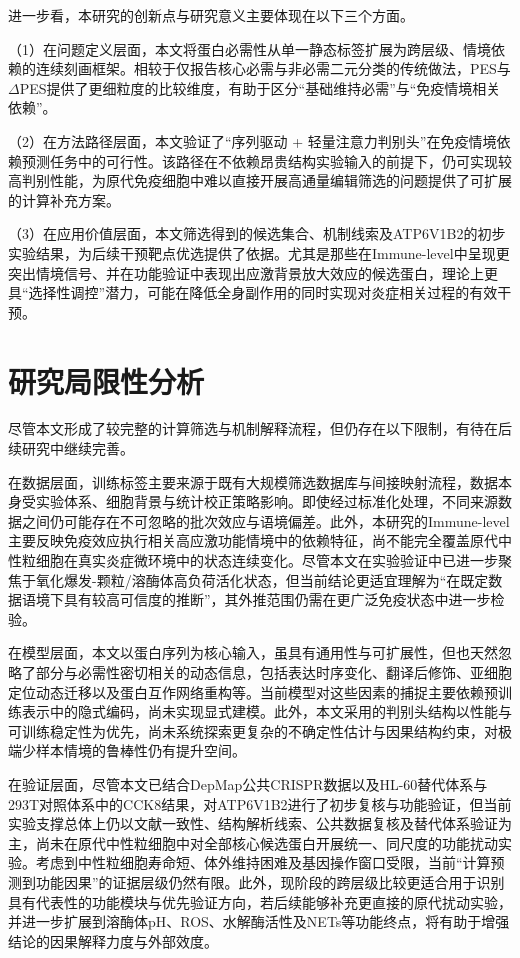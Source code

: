 进一步看，本研究的创新点与研究意义主要体现在以下三个方面。

（1）在问题定义层面，本文将蛋白必需性从单一静态标签扩展为跨层级、情境依赖的连续刻画框架。相较于仅报告核心必需与非必需二元分类的传统做法，PES与 $\Delta$PES提供了更细粒度的比较维度，有助于区分“基础维持必需”与“免疫情境相关依赖”。

（2）在方法路径层面，本文验证了“序列驱动 + 轻量注意力判别头”在免疫情境依赖预测任务中的可行性。该路径在不依赖昂贵结构实验输入的前提下，仍可实现较高判别性能，为原代免疫细胞中难以直接开展高通量编辑筛选的问题提供了可扩展的计算补充方案。

（3）在应用价值层面，本文筛选得到的候选集合、机制线索及ATP6V1B2的初步实验结果，为后续干预靶点优选提供了依据。尤其是那些在Immune-level中呈现更突出情境信号、并在功能验证中表现出应激背景放大效应的候选蛋白，理论上更具“选择性调控”潜力，可能在降低全身副作用的同时实现对炎症相关过程的有效干预。

\section{研究局限性分析}

尽管本文形成了较完整的计算筛选与机制解释流程，但仍存在以下限制，有待在后续研究中继续完善。

在数据层面，训练标签主要来源于既有大规模筛选数据库与间接映射流程，数据本身受实验体系、细胞背景与统计校正策略影响。即使经过标准化处理，不同来源数据之间仍可能存在不可忽略的批次效应与语境偏差。此外，本研究的Immune-level主要反映免疫效应执行相关高应激功能情境中的依赖特征，尚不能完全覆盖原代中性粒细胞在真实炎症微环境中的状态连续变化。尽管本文在实验验证中已进一步聚焦于氧化爆发-颗粒/溶酶体高负荷活化状态，但当前结论更适宜理解为“在既定数据语境下具有较高可信度的推断”，其外推范围仍需在更广泛免疫状态中进一步检验。

在模型层面，本文以蛋白序列为核心输入，虽具有通用性与可扩展性，但也天然忽略了部分与必需性密切相关的动态信息，包括表达时序变化、翻译后修饰、亚细胞定位动态迁移以及蛋白互作网络重构等。当前模型对这些因素的捕捉主要依赖预训练表示中的隐式编码，尚未实现显式建模。此外，本文采用的判别头结构以性能与可训练稳定性为优先，尚未系统探索更复杂的不确定性估计与因果结构约束，对极端少样本情境的鲁棒性仍有提升空间。

在验证层面，尽管本文已结合DepMap公共CRISPR数据以及HL-60替代体系与293T对照体系中的CCK8结果，对ATP6V1B2进行了初步复核与功能验证，但当前实验支撑总体上仍以文献一致性、结构解析线索、公共数据复核及替代体系验证为主，尚未在原代中性粒细胞中对全部核心候选蛋白开展统一、同尺度的功能扰动实验。考虑到中性粒细胞寿命短、体外维持困难及基因操作窗口受限，当前“计算预测到功能因果”的证据层级仍然有限。此外，现阶段的跨层级比较更适合用于识别具有代表性的功能模块与优先验证方向，若后续能够补充更直接的原代扰动实验，并进一步扩展到溶酶体pH、ROS、水解酶活性及NETs等功能终点，将有助于增强结论的因果解释力度与外部效度。

